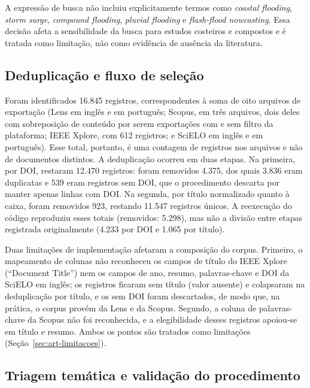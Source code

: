 A expressão de busca não incluiu explicitamente termos como \textit{coastal flooding}, \textit{storm surge}, \textit{compound flooding}, \textit{pluvial flooding} e \textit{flash-flood nowcasting}. Essa decisão afeta a sensibilidade da busca para estudos costeiros e compostos e é tratada como limitação, não como evidência de ausência da literatura.

\subsection{Deduplicação e fluxo de seleção}

Foram identificados 16.845 registros, correspondentes à soma de oito arquivos de exportação (Lens em inglês e em português; Scopus, em três arquivos, dois deles com sobreposição de conteúdo por serem exportações com e sem filtro da plataforma; IEEE Xplore, com 612 registros; e SciELO em inglês e em português). Esse total, portanto, é uma contagem de registros nos arquivos e não de documentos distintos. A deduplicação ocorreu em duas etapas. Na primeira, por DOI, restaram 12.470 registros: foram removidos 4.375, dos quais 3.836 eram duplicatas e 539 eram registros sem DOI, que o procedimento descarta por manter apenas linhas com DOI. Na segunda, por título normalizado quanto à caixa, foram removidos 923, restando 11.547 registros únicos. A reexecução do código reproduziu esses totais (removidos: 5.298), mas não a divisão entre etapas registrada originalmente (4.233 por DOI e 1.065 por título).

Duas limitações de implementação afetaram a composição do corpus. Primeiro, o mapeamento de colunas não reconheceu os campos de título do IEEE Xplore (``Document Title'') nem os campos de ano, resumo, palavras-chave e DOI da SciELO em inglês; os registros ficaram sem título (valor ausente) e colapsaram na deduplicação por título, e os sem DOI foram descartados, de modo que, na prática, o corpus provém da Lens e da Scopus. Segundo, a coluna de palavras-chave da Scopus não foi reconhecida, e a elegibilidade desses registros apoiou-se em título e resumo. Ambos os pontos são tratados como limitações (Seção~\ref{sec:art-limitacoes}).

\subsection{Triagem temática e validação do procedimento}
\label{sec:art-triagem}

